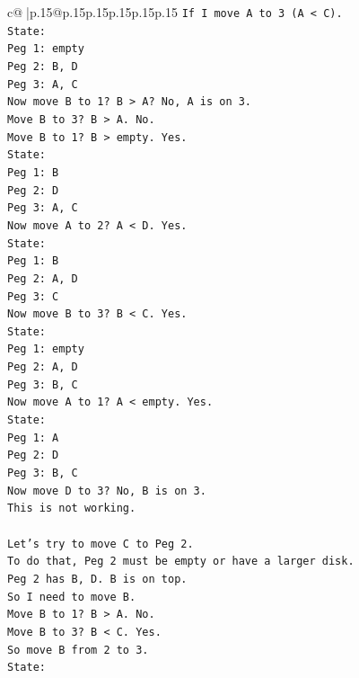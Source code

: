 \documentclass{article}
\begin{document}
{\begin{supertabular}{c@{$\;$}|p{.15\linewidth}@{}p{.15\linewidth}p{.15\linewidth}p{.15\linewidth}p{.15\linewidth}p{.15\linewidth}}
{{{\texttt{If I move A to 3 (A < C).} \\
\texttt{State:} \\
\texttt{Peg 1: empty} \\
\texttt{Peg 2: B, D} \\
\texttt{Peg 3: A, C} \\
\texttt{Now move B to 1? B > A? No, A is on 3.} \\
\texttt{Move B to 3? B > A. No.} \\
\texttt{Move B to 1? B > empty. Yes.} \\
\texttt{State:} \\
\texttt{Peg 1: B} \\
\texttt{Peg 2: D} \\
\texttt{Peg 3: A, C} \\
\texttt{Now move A to 2? A < D. Yes.} \\
\texttt{State:} \\
\texttt{Peg 1: B} \\
\texttt{Peg 2: A, D} \\
\texttt{Peg 3: C} \\
\texttt{Now move B to 3? B < C. Yes.} \\
\texttt{State:} \\
\texttt{Peg 1: empty} \\
\texttt{Peg 2: A, D} \\
\texttt{Peg 3: B, C} \\
\texttt{Now move A to 1? A < empty. Yes.} \\
\texttt{State:} \\
\texttt{Peg 1: A} \\
\texttt{Peg 2: D} \\
\texttt{Peg 3: B, C} \\
\texttt{Now move D to 3? No, B is on 3.} \\
\texttt{This is not working.} \\
\\ 
\texttt{Let's try to move C to Peg 2.} \\
\texttt{To do that, Peg 2 must be empty or have a larger disk.} \\
\texttt{Peg 2 has B, D. B is on top.} \\
\texttt{So I need to move B.} \\
\texttt{Move B to 1? B > A. No.} \\
\texttt{Move B to 3? B < C. Yes.} \\
\texttt{So move B from 2 to 3.} \\
\texttt{State:} \\
}}}
\end{supertabular}}
\end{document}

